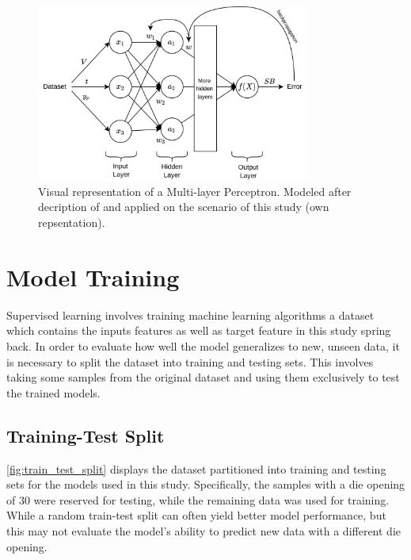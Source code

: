 {\begin{figure}[h]
    \begin{tcolorbox}[arc=0pt,boxrule=0.5pt]
        \centering
        \includegraphics[width=0.8\textwidth]{chap4/images/mlp_example}
    \end{tcolorbox}
    \caption{Visual representation of a Multi-layer Perceptron. Modeled after decription of
    \cite{nielsen_neuralnetworksdeep_2015} and applied on the scenario of this study
        (own repsentation). }
    \label{fig:mlp-example}
\end{figure}


\section{Model Training}\label{sec:model-training}
Supervised learning involves training machine learning algorithms a dataset which contains the inputs features as well
as target feature in this study spring back.
In order to evaluate how well the model generalizes to new, unseen data, it is necessary to
split the dataset into training and testing sets.
This involves taking some samples from the original dataset and using them exclusively to test the trained models.

\subsection{Training-Test Split}\label{subsec:training-test-split}
\cref{fig:train_test_split} displays the dataset partitioned into training and testing sets for the models used in
this study.
Specifically, the samples with a die opening of 30 were reserved for testing, while the remaining data was used for
training.
While a random train-test split can often yield better model performance, but this may not evaluate the model's ability
to predict new data with a different die opening.

}
